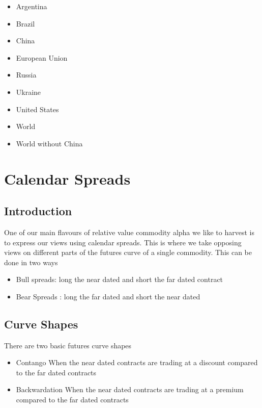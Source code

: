 \documentclass[
]{book}
\providecommand{\tightlist}{%
  \setlength{\itemsep}{0pt}\setlength{\parskip}{0pt}}
\begin{document}
\begin{itemize}
\tightlist
\item
  Argentina
\item
  Brazil
\item
  China
\item
  European Union
\item
  Russia
\item
  Ukraine
\item
  United States
\item
  World
\item
  World without China
\end{itemize}

\hypertarget{calendar-spreads}{%
\chapter{Calendar Spreads}\label{calendar-spreads}}

\hypertarget{introduction}{%
\section{Introduction}\label{introduction}}

One of our main flavours of relative value commodity alpha we like to harvest is to express our views using calendar spreads. This is where we take opposing views on different parts of the futures curve of a single commodity. This can be done in two ways

\begin{itemize}
\tightlist
\item
  Bull spreads: long the near dated and short the far dated contract
\item
  Bear Spreads : long the far dated and short the near dated
\end{itemize}

\hypertarget{curve-shapes}{%
\section{Curve Shapes}\label{curve-shapes}}

There are two basic futures curve shapes

\begin{itemize}
\item
  Contango
  When the near dated contracts are trading at a discount compared to the far dated contracts
\item
  Backwardation
  When the near dated contracts are trading at a premium compared to the far dated contracts
\end{itemize}
\end{document}
